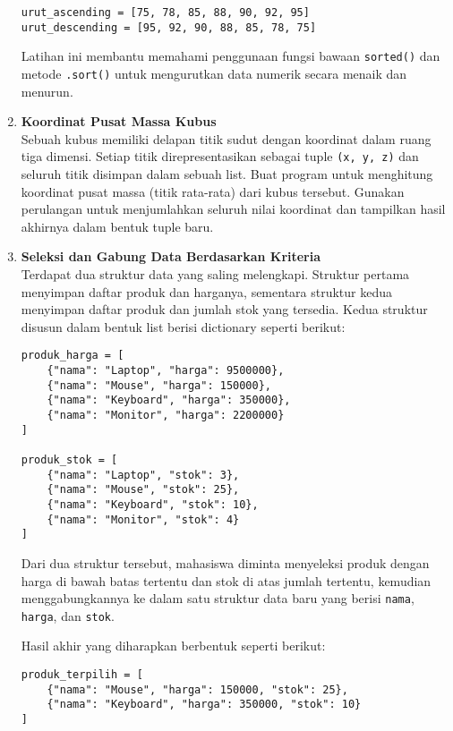 \begin{enumerate}
\begin{lstlisting}[style=PythonStyle]
urut_ascending = [75, 78, 85, 88, 90, 92, 95]
urut_descending = [95, 92, 90, 88, 85, 78, 75]
\end{lstlisting}

Latihan ini membantu memahami penggunaan fungsi bawaan \texttt{sorted()} 
dan metode \texttt{.sort()} untuk mengurutkan data numerik secara menaik dan menurun.


  \item \textbf{Koordinat Pusat Massa Kubus} \\
  Sebuah kubus memiliki delapan titik sudut dengan koordinat dalam ruang tiga dimensi. 
  Setiap titik direpresentasikan sebagai tuple \texttt{(x, y, z)} dan seluruh titik disimpan dalam sebuah list.  
  Buat program untuk menghitung koordinat pusat massa (titik rata-rata) dari kubus tersebut.  
  Gunakan perulangan untuk menjumlahkan seluruh nilai koordinat dan tampilkan hasil akhirnya dalam bentuk tuple baru.



  \item \textbf{Seleksi dan Gabung Data Berdasarkan Kriteria} \\
Terdapat dua struktur data yang saling melengkapi. 
Struktur pertama menyimpan daftar produk dan harganya, 
sementara struktur kedua menyimpan daftar produk dan jumlah stok yang tersedia. 
Kedua struktur disusun dalam bentuk list berisi dictionary seperti berikut:

\begin{lstlisting}[style=PythonStyle]
produk_harga = [
    {"nama": "Laptop", "harga": 9500000},
    {"nama": "Mouse", "harga": 150000},
    {"nama": "Keyboard", "harga": 350000},
    {"nama": "Monitor", "harga": 2200000}
]

produk_stok = [
    {"nama": "Laptop", "stok": 3},
    {"nama": "Mouse", "stok": 25},
    {"nama": "Keyboard", "stok": 10},
    {"nama": "Monitor", "stok": 4}
]
\end{lstlisting}

Dari dua struktur tersebut, mahasiswa diminta menyeleksi produk 
dengan harga di bawah batas tertentu dan stok di atas jumlah tertentu, 
kemudian menggabungkannya ke dalam satu struktur data baru yang berisi 
\texttt{nama}, \texttt{harga}, dan \texttt{stok}. 

Hasil akhir yang diharapkan berbentuk seperti berikut:

\begin{lstlisting}[style=PythonStyle]
produk_terpilih = [
    {"nama": "Mouse", "harga": 150000, "stok": 25},
    {"nama": "Keyboard", "harga": 350000, "stok": 10}
]
\end{lstlisting}


\end{enumerate}
